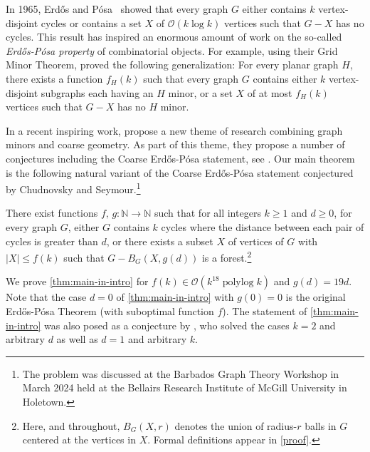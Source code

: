 \documentclass{patmorin}
\newcommand{\pat}[1]{\textcolor{Blue}{[Pat: #1]}}
\newcommand{\gwen}[1]{\textcolor{Purple}{Gwen: #1}}
\DeclareMathOperator{\polylog}{polylog}
\newcommand{\Oh}{\mathcal{O}}
\begin{document}
In 1965, Erdős and Pósa~\cite{EP1965} showed that every graph $G$
either contains $k$ vertex-disjoint cycles
or contains a set $X$ of $\Oh(k\log k)$ vertices such that $G-X$ has no cycles.
This result has inspired an enormous amount of work on the so-called \emph{Erdős-Pósa property} of combinatorial objects.
For example, using their Grid Minor Theorem, \citet{RS1986} proved the following generalization: For every planar graph $H$, there exists a function $f_H(k)$ such that every graph $G$ contains either $k$ vertex-disjoint subgraphs each having an $H$ minor, or a set $X$ of at most $f_H(k)$ vertices such that $G-X$ has no $H$ minor.

In a recent inspiring work, \citet{GP23} propose a new theme of research combining graph minors and coarse geometry.
As part of this theme, they propose a number of conjectures including the Coarse Erdős-Pósa statement, see \cite[Conjecture 9.7]{GP23}. Our main theorem is the following natural variant of the Coarse Erdős-Pósa statement conjectured by Chudnovsky and Seymour.\footnote{The problem was discussed at the Barbados Graph Theory Workshop in March 2024 held at the Bellairs Research Institute of McGill University in Holetown.}


\begin{thm}\label{thm:main-in-intro}
  There exist functions $f,\, g:\mathbb{N}\to\mathbb{N}$ such that for all integers $k\ge 1$ and $d\ge 0$, for every graph $G$,  either $G$ contains $k$ cycles where the distance between each pair of cycles is greater than $d$, or  there exists a subset $X$ of vertices of $G$ with $|X|\leq f(k)$ such that  $G-B_G(X,g(d))$ is a forest.\footnote{Here, and throughout, $B_G(X,r)$ denotes the union of radius-$r$ balls in $G$ centered at the vertices in $X$.  Formal definitions appear in \cref{proof}.}
\end{thm}
We prove \cref{thm:main-in-intro} for $f(k)\in\Oh(k^{18}\polylog k)$ and $g(d)=19d$. 
Note that the case $d=0$ of \cref{thm:main-in-intro} with $g(0)=0$ is the original Erd\H{o}s-Pósa Theorem (with suboptimal function $f$).
The statement of \cref{thm:main-in-intro} was also posed as a conjecture by \citet{ahn.gollin:coarse}, who solved the cases $k=2$ and arbitrary $d$ as well as $d=1$ and arbitrary $k$.
\end{document}
